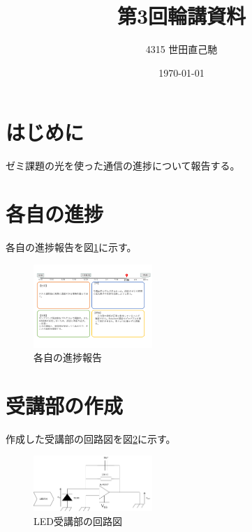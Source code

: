 \documentclass[a4paper,12pt]{article}
\title{第3回輪講資料}
\date{\today}
\author{4315 世田直己馳}
\begin{document}
 
\maketitle

\begin{multicols}{2}
\section{はじめに}
ゼミ課題の光を使った通信の進捗について報告する。

\section{各自の進捗}
各自の進捗報告を図\ref{sintyoku}に示す。
\begin{figure}[H]
  \centering
  \includegraphics[width=0.4\textwidth]{fig/sintyoku.pdf}
  \caption{各自の進捗報告}
  \label{sintyoku}
  \end{figure}

\section{受講部の作成}
作成した受講部の回路図を図\ref{jukou}に示す。

\begin{figure}[H]
  \centering
  \includegraphics[width=0.4\textwidth]{fig/LEDjukou.png}
  \caption{LED受講部の回路図}
  \label{jukou}
  \end{figure}


\end{multicols}
\end{document}
